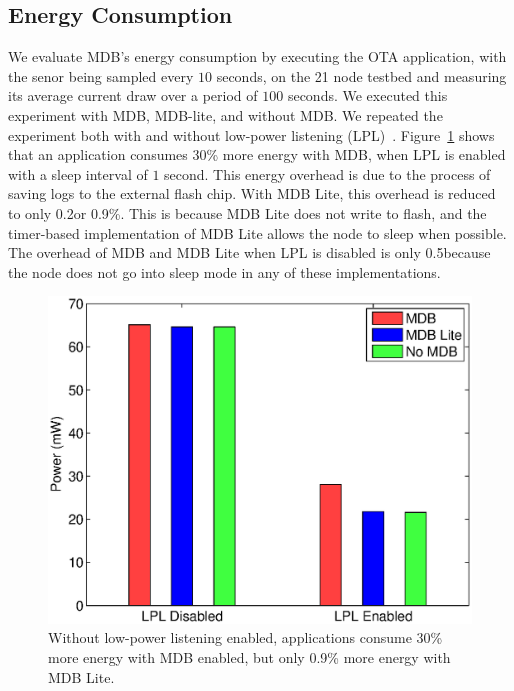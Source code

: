 \subsection{Energy Consumption} \label{PowerConsumption}

We evaluate MDB's energy consumption by executing the OTA application, with the
senor being sampled every $10$ seconds, on the 21 node testbed and measuring its
average current draw over a period of $100$ seconds.  We executed this
experiment with MDB, MDB-lite, and without MDB\@.  We repeated the experiment
both with and without low-power listening
(LPL)~\cite{Polastrea}. Figure~\ref{fig:powerConsumption} shows that an
application consumes 30\% more energy with MDB, when LPL is enabled with a sleep
interval of $1$ second.  This energy overhead is due to the process of saving
logs to the external flash chip. With MDB Lite, this overhead is reduced to only
0.2\mW or 0.9\%.  This is because MDB Lite does not write to flash, and the
timer-based implementation of MDB Lite allows the node to sleep when possible.
The overhead of MDB and MDB Lite when LPL is disabled is only 0.5\mW because the
node does not go into sleep mode in any of these implementations.

\begin{figure}[t]
  \centering \includegraphics[scale=0.75]{fig/energy}
  \caption[Energy Consumption]{Without low-power listening enabled, applications
  consume 30\% more energy with MDB enabled, but only 0.9\% more energy with MDB
  Lite. }
    \label{fig:powerConsumption}
\end{figure}

